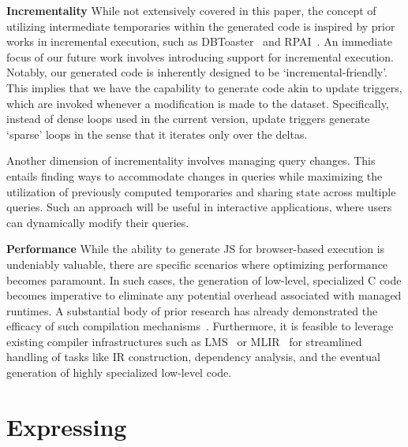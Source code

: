 \documentclass[runningheads]{llncs}
\newcommand{\lang}{Rhyme}
\begin{document}
\textbf{Incrementality}
While not extensively covered in this paper, the concept of utilizing
intermediate temporaries within the generated code is inspired by prior
works in incremental execution, such as DBToaster~\cite{dbtoaster_vldb}
and RPAI~\cite{rpai}.
An immediate focus of our future work involves introducing support for
incremental execution.
Notably, our generated code is inherently designed to be `incremental-friendly'.
This implies that we have the capability to generate code akin to update
triggers, which are invoked whenever a modification is made to the dataset.
Specifically, instead of dense loops used in the current version, update triggers
generate `sparse' loops in the sense that it iterates only over the deltas.

Another dimension of incrementality involves managing query changes.
This entails finding ways to accommodate changes in queries while maximizing
the utilization of previously computed temporaries and sharing state across
multiple queries. 
Such an approach will be useful in interactive applications, where users
can dynamically modify their queries.

\textbf{Performance}
While the ability to generate JS for browser-based execution is undeniably valuable,
there are specific scenarios where optimizing performance becomes paramount.
In such cases, the generation of low-level, specialized C code becomes imperative to
eliminate any potential overhead associated with managed runtimes.
A substantial body of prior research has already demonstrated the efficacy of
such compilation mechanisms~\cite{500lines,lb2,flare_osdi,sai_guannan}.
Furthermore, it is feasible to leverage existing compiler infrastructures such
as LMS~\cite{lms} or MLIR~\cite{mlir} for streamlined handling of tasks like
IR construction, dependency analysis, and the eventual generation of highly
specialized low-level code.




%
%




\appendix
\section{Expressing }

\end{document}
